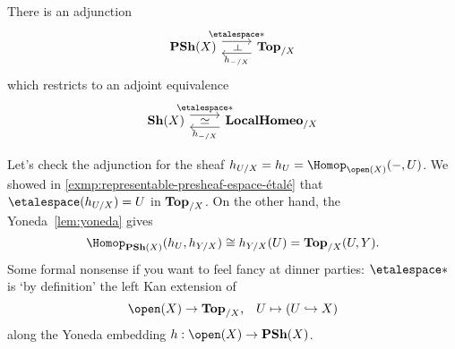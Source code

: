 \documentclass[../main.tex]{subfiles}
\begin{document}
\begin{thm}\label{thm:sheaf-space-adjunction}
There is an adjunction
\begin{equation*}
  \begin{tikzcd}
    \catPresheaf(X) \ar[r, "{\etalespace*}"{name=leftadj}, shift left=2] & \catTopologicalSpace_{/X} \ar[l, "h_{-/X}"{name=rightadj}, shift left=2]
    \ar[from=leftadj, to=rightadj, phantom, "\leftadj" marking]
  \end{tikzcd}
\end{equation*}
which restricts to an adjoint equivalence
\begin{equation*}
  \begin{tikzcd}
    \catSheaf(X) \ar[r, "{\etalespace*}"{name=leftadj}, shift left=2] & \catLocalHomeomorphism_{/X} \ar[l, "h_{-/X}"{name=rightadj}, shift left=2]
    \ar[from=leftadj, to=rightadj, phantom, "\simeq"]
  \end{tikzcd}
\end{equation*}
\end{thm}

\begin{exmp}
Let's check the adjunction for the sheaf $h_{U/X} = h_U = \Hom[\open(X)](-,U)$.
We showed in \cref{exmp:representable-presheaf-espace-étalé} that $\etalespace(h_{U/X}) = U$ in $\mathbf{Top}_{/X}$.
On the other hand, the Yoneda~\cref{lem:yoneda} gives
\[ \Hom[\catPresheaf(X)](h_U,h_{Y/X}) \cong h_{Y/X}(U) = \cont[X](U,Y)\text{.} \]
Some formal nonsense if you want to feel fancy at dinner parties: $\etalespace*$ is `by definition' the left Kan extension of
\[ \open(X)\to\catTopologicalSpace_{/X}\text{,} \quad U \mapsto (U\hookrightarrow X) \]
along the Yoneda embedding $h\colon\open(X)\to\catPresheaf(X)$.
\end{exmp}
\end{document}
